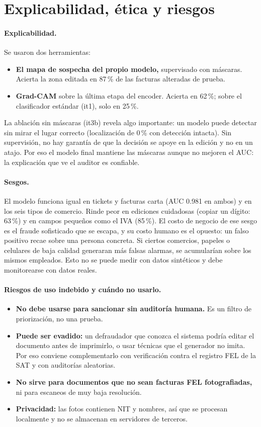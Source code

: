 \documentclass[11pt,letterpaper]{article}
\begin{document}
\section{Explicabilidad, ética y riesgos}

\paragraph{Explicabilidad.} Se usaron dos herramientas:
\begin{itemize}
  \item \textbf{El mapa de sospecha del propio modelo,} supervisado con máscaras. Acierta la zona editada en 87\,\% de las facturas alteradas de prueba.
  \item \textbf{Grad-CAM} sobre la última etapa del encoder. Acierta en 62\,\%; sobre el clasificador estándar (it1), solo en 25\,\%.
\end{itemize}
La ablación sin máscaras (it3b) revela algo importante: un modelo puede detectar sin mirar el lugar correcto (localización de 0\,\% con detección intacta). Sin supervisión, no hay garantía de que la decisión se apoye en la edición y no en un atajo. Por eso el modelo final mantiene las máscaras aunque no mejoren el AUC: la explicación que ve el auditor es confiable.

\paragraph{Sesgos.} El modelo funciona igual en tickets y facturas carta (AUC 0.981 en ambos) y en los seis tipos de comercio. Rinde peor en ediciones cuidadosas (copiar un dígito: 63\,\%) y en campos pequeños como el IVA (85\,\%). El costo de negocio de ese sesgo es el fraude sofisticado que se escapa, y su costo humano es el opuesto: un falso positivo recae sobre una persona concreta. Si ciertos comercios, papeles o celulares de baja calidad generaran más falsas alarmas, se acumularían sobre los mismos empleados. Esto no se puede medir con datos sintéticos y debe monitorearse con datos reales.

\paragraph{Riesgos de uso indebido y cuándo no usarlo.}
\begin{itemize}
  \item \textbf{No debe usarse para sancionar sin auditoría humana.} Es un filtro de priorización, no una prueba.
  \item \textbf{Puede ser evadido:} un defraudador que conozca el sistema podría editar el documento antes de imprimirlo, o usar técnicas que el generador no imita. Por eso conviene complementarlo con verificación contra el registro FEL de la SAT y con auditorías aleatorias.
  \item \textbf{No sirve para documentos que no sean facturas FEL fotografiadas,} ni para escaneos de muy baja resolución.
  \item \textbf{Privacidad:} las fotos contienen NIT y nombres, así que se procesan localmente y no se almacenan en servidores de terceros.
\end{itemize}
\end{document}

